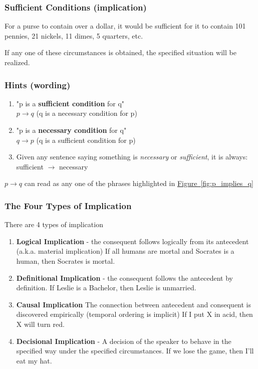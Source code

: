 \documentclass[12pt]{article}
\begin{document}

\subsubsection{Sufficient Conditions (implication)}

For a purse to contain over a dollar, it would be sufficient for it to contain
101 pennies, 21 nickels, 11 dimes, 5 quarters, etc.

If any one of these circumstances is obtained, the specified situation will
be realized.

\subsubsection{Hints (wording)}

\begin{enumerate}
  \item "p is a \textbf{sufficient condition} for q"\\
    $p \to q$ (q is a necessary condition for p)
  \item "p is a \textbf{necessary condition} for q"\\
    $q \to p$ (q is a sufficient condition for p)
  \item Given any sentence saying something is \textit{necessary} or 
    \textit{sufficient}, it is always:\\
    sufficient $\to$ necessary
\end{enumerate}

$p\to q$ can read as any one of the phrases highlighted in
\hyperref[fig:p_implies_q]{Figure~\ref*{fig:p_implies_q}}

\subsubsection{The Four Types of Implication}

There are 4 types of implication

\begin{enumerate}
\item \textbf{Logical Implication} - the consequent follows logically from its
  antecedent (a.k.a. material implication)
  \subitem If all humans are mortal and Socrates is a human, then Socrates is
    mortal.
\item \textbf{Definitional Implication} - the consequent follows the antecedent
  by definition.
  \subitem If Leslie is a Bachelor, then Leslie is unmarried.
\item \textbf{Causal Implication} The connection between antecedent and 
  consequent is discovered empirically (temporal ordering is implicit)
  \subitem If I put X in acid, then X will turn red.
\item \textbf{Decisional Implication} - A decision of the speaker to behave in
  the specified way under the specified circumstances.
  \subitem If we lose the game, then I'll eat my hat.
\end{enumerate}
\end{document}
